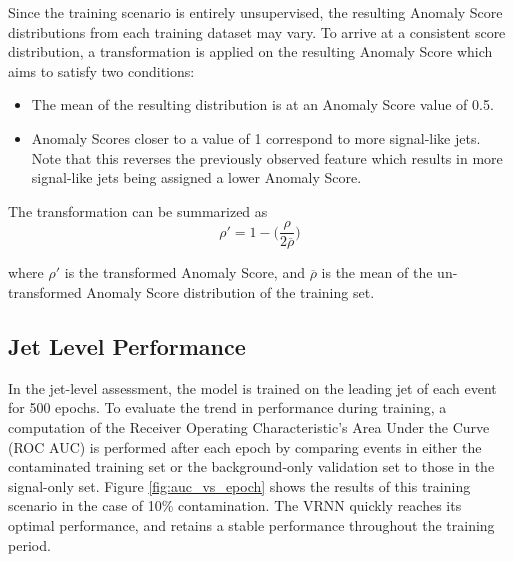 \documentclass[12pt, a4paper]{article}
\begin{document}
Since the training scenario is entirely unsupervised, the resulting Anomaly Score distributions from each training dataset may vary. To arrive at a consistent score distribution, a transformation is applied on the resulting Anomaly Score which aims to satisfy two conditions:
\begin{itemize}
	\item{The mean of the resulting distribution is at an Anomaly Score value of 0.5.}
	\item{Anomaly Scores closer to a value of 1 correspond to more signal-like jets. Note that this reverses the previously observed feature which results in more signal-like jets being assigned a lower Anomaly Score.}
\end{itemize}

The transformation can be summarized as
\begin{equation}
	\rho ' = 1 - \bigg(\frac{\rho}{2\overline{\rho}}\bigg)
\end{equation}

where $\rho '$ is the transformed Anomaly Score, and  $\overline{\rho}$ is the mean of the un-transformed Anomaly Score distribution of the training set.


\subsection{Jet Level Performance}


In the jet-level assessment, the model is trained on the leading jet of each event for 500 epochs. To evaluate the trend in performance during training, a computation of the Receiver Operating Characteristic's Area Under the Curve (ROC AUC) is performed after each epoch by comparing events in either the contaminated training set or the background-only validation set to those in the signal-only set. Figure \ref{fig:auc_vs_epoch} shows the results of this training scenario in the case of 10\% contamination. The VRNN quickly reaches its optimal performance, and retains a stable performance throughout the training period. 
\end{document}
